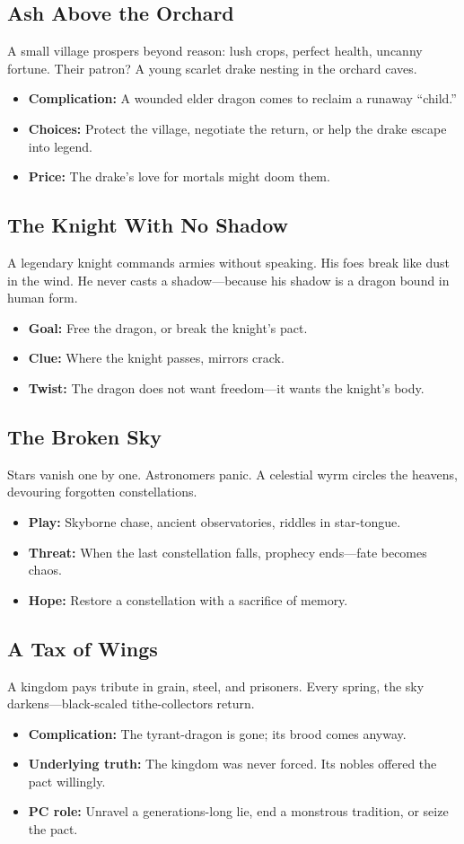 \documentclass[11pt,letterpaper]{article}
\newcommand{\subsectionheader}[1]{\subsection*{#1}}
\begin{document}
\subsectionheader{Ash Above the Orchard}
A small village prospers beyond reason: lush crops, perfect health, uncanny fortune.
Their patron? A young scarlet drake nesting in the orchard caves.
\begin{itemize}[leftmargin=*]
\item \textbf{Complication:} A wounded elder dragon comes to reclaim a runaway ``child.''
\item \textbf{Choices:} Protect the village, negotiate the return, or help the drake escape into legend.
\item \textbf{Price:} The drake's love for mortals might doom them.
\end{itemize}

\subsectionheader{The Knight With No Shadow}
A legendary knight commands armies without speaking.  
His foes break like dust in the wind.  
He never casts a shadow---because his shadow is a dragon bound in human form.
\begin{itemize}[leftmargin=*]
\item \textbf{Goal:} Free the dragon, or break the knight's pact.
\item \textbf{Clue:} Where the knight passes, mirrors crack.
\item \textbf{Twist:} The dragon does not want freedom---it wants the knight's body.
\end{itemize}

\subsectionheader{The Broken Sky}
Stars vanish one by one. Astronomers panic.  
A celestial wyrm circles the heavens, devouring forgotten constellations.
\begin{itemize}[leftmargin=*]
\item \textbf{Play:} Skyborne chase, ancient observatories, riddles in star-tongue.
\item \textbf{Threat:} When the last constellation falls, prophecy ends---fate becomes chaos.
\item \textbf{Hope:} Restore a constellation with a sacrifice of memory.
\end{itemize}

\subsectionheader{A Tax of Wings}
A kingdom pays tribute in grain, steel, and prisoners.  
Every spring, the sky darkens---black-scaled tithe-collectors return.
\begin{itemize}[leftmargin=*]
\item \textbf{Complication:} The tyrant-dragon is gone; its brood comes anyway.
\item \textbf{Underlying truth:} The kingdom was never forced. Its nobles offered the pact willingly.
\item \textbf{PC role:} Unravel a generations-long lie, end a monstrous tradition, or seize the pact.
\end{itemize}
\end{document}

